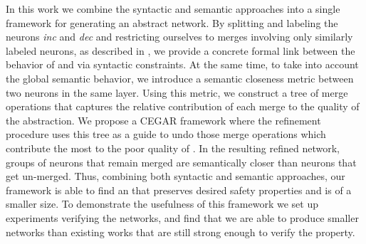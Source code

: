 In this work we combine the syntactic and semantic approaches into a single
framework for generating an abstract network. By splitting and labeling the
neurons \textit{inc} and \textit{dec} and
restricting ourselves to merges involving only similarly labeled neurons, 
as described in \cite{cegar-nn}, we
provide a concrete formal link between the behavior of \cnc and \abs via
syntactic constraints. At the same time, to take into account the global
semantic behavior, we introduce a semantic closeness metric between two neurons
in the same layer. Using this metric, we construct a tree of merge operations
that captures the relative contribution of each merge to the quality of the
abstraction. We propose a CEGAR framework where
the refinement procedure
uses this tree as a guide
to undo those merge operations which contribute the most to the poor quality of
\abs.
In the resulting refined network, groups of neurons that remain
merged are semantically closer than neurons that get un-merged. 
Thus, combining both syntactic and semantic approaches, our framework
is able to find an \abs that preserves desired safety properties and is of a
smaller size.
To demonstrate
the usefulness of this framework we set up 
experiments
verifying the \acasxu networks, and find that we
are able to produce smaller networks than existing works that are still strong
enough to verify the property.

